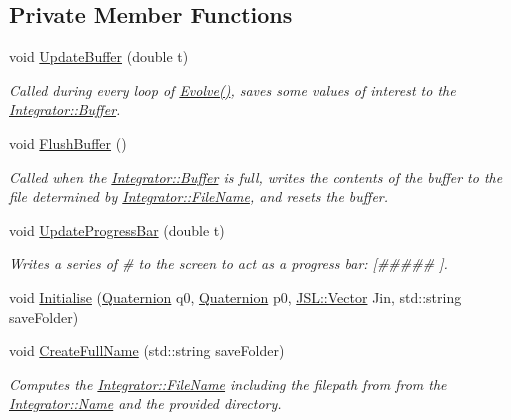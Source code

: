 \subsection*{Private Member Functions}
\begin{DoxyCompactItemize}
\item 
void \hyperlink{classQDynamics_1_1Integrator_af613a42e489de2d041673fd5be0ebb61}{Update\+Buffer} (double t)
\begin{DoxyCompactList}\small\item\em Called during every loop of \hyperlink{classQDynamics_1_1Integrator_a4b921b312775194b77c2c85f93add84e}{Evolve()}, saves some values of interest to the \hyperlink{classQDynamics_1_1Integrator_af8889c2bbe10237a8dd8c46b25b15d29}{Integrator\+::\+Buffer}. \end{DoxyCompactList}\item 
void \hyperlink{classQDynamics_1_1Integrator_a571bd4098f5d245bf46cf7683dcc554a}{Flush\+Buffer} ()
\begin{DoxyCompactList}\small\item\em Called when the \hyperlink{classQDynamics_1_1Integrator_af8889c2bbe10237a8dd8c46b25b15d29}{Integrator\+::\+Buffer} is full, writes the contents of the buffer to the file determined by \hyperlink{classQDynamics_1_1Integrator_a19ed0b9864ebe762914cee04cb0ad4b3}{Integrator\+::\+File\+Name}, and resets the buffer. \end{DoxyCompactList}\item 
void \hyperlink{classQDynamics_1_1Integrator_a88dc286b39899bdec60c040427d663cc}{Update\+Progress\+Bar} (double t)
\begin{DoxyCompactList}\small\item\em Writes a series of \# to the screen to act as a progress bar\+: \mbox{[}\#\#\#\#\# \mbox{]}. \end{DoxyCompactList}\item 
void \hyperlink{classQDynamics_1_1Integrator_aa1afd442ef37708fcadb45ca8e7958f5}{Initialise} (\hyperlink{classQDynamics_1_1Quaternion}{Quaternion} q0, \hyperlink{classQDynamics_1_1Quaternion}{Quaternion} p0, \hyperlink{classJSL_1_1Vector}{J\+S\+L\+::\+Vector} Jin, std\+::string save\+Folder)
\item 
void \hyperlink{classQDynamics_1_1Integrator_ae80ab509b96a9b996934d9ef127f5137}{Create\+Full\+Name} (std\+::string save\+Folder)
\begin{DoxyCompactList}\small\item\em Computes the \hyperlink{classQDynamics_1_1Integrator_a19ed0b9864ebe762914cee04cb0ad4b3}{Integrator\+::\+File\+Name} including the filepath from from the \hyperlink{classQDynamics_1_1Integrator_aa3e27d68428619ab4083b2d42ef8924c}{Integrator\+::\+Name} and the provided directory. \end{DoxyCompactList}\item 

\end{DoxyCompactItemize}
